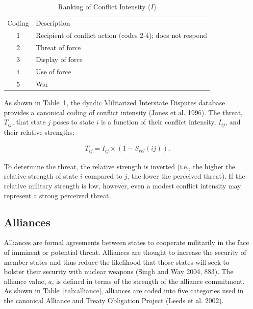 \documentclass{article} %
\begin{document}
{\begin{table}
\centering
\caption{Ranking of Conflict Intensity ($I$)
\label{tab:intensity}}
\begin{tabular}{c@{\hskip 0.25in}l}
\hline\noalign{\smallskip}
Coding & Description\\
\noalign{\smallskip}
\hline
\noalign{\smallskip}
1 & Recipient of conflict action (codes 2-4); does not respond \\
2  & Threat of force \\
3 & Display of force \\
4 & Use of force \\
5 & War \\
\hline
\end{tabular}
\end{table}

As shown in Table~\ref{tab:intensity}, the dyadic Militarized Interstate Disputes database provides a canonical coding of conflict intensity (Jones et al. 1996). The threat, $T_{ij}$, that state $j$ poses to state $i$ is a function of their conflict intensity, $I_{ij}$, and their relative strengths:  
\begin{center}
\begin{equation}
\begin{aligned}
T_{ij} = I_{ij} \times (1 - S_{rel}(ij)).
\end{aligned}
\end{equation}
\end{center}
To determine the threat, the relative strength is inverted (i.e., the higher the relative strength of state $i$ compared to $j$, the lower the perceived threat). If the relative military strength is low, however, even a modest conflict intensity may represent a strong perceived threat. 

\subsection{Alliances}

Alliances are formal agreements between states to cooperate militarily in the face of imminent or potential threat. Alliances are thought to increase the security of member states and thus reduce the likelihood that those states will seek to bolster their security with nuclear weapons (Singh and Way 2004, 883). The alliance value, $a$, is defined in terms of the strength of the alliance commitment. As shown in Table~\ref{tab:alliance}, alliances are coded into five categories used in the canonical Alliance and Treaty Obligation Project (Leeds et al. 2002). 

}
\end{document}
